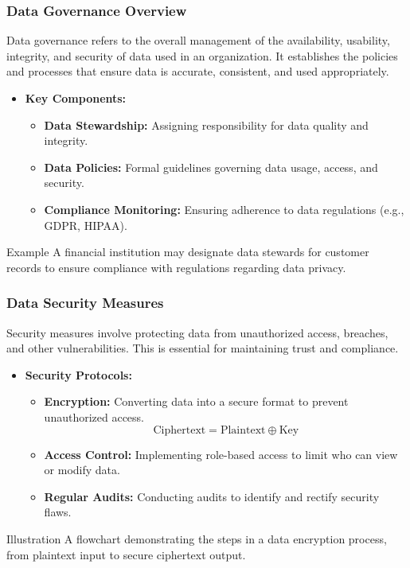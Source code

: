 \documentclass{beamer}
\begin{document}
\begin{frame}[fragile]
    \frametitle{Data Governance Overview}
    Data governance refers to the overall management of the availability, usability, integrity, and security of data used in an organization. 
    It establishes the policies and processes that ensure data is accurate, consistent, and used appropriately.

    \begin{itemize}
        \item \textbf{Key Components:}
        \begin{itemize}
            \item \textbf{Data Stewardship:} Assigning responsibility for data quality and integrity.
            \item \textbf{Data Policies:} Formal guidelines governing data usage, access, and security.
            \item \textbf{Compliance Monitoring:} Ensuring adherence to data regulations (e.g., GDPR, HIPAA).
        \end{itemize}
    \end{itemize}

    \begin{block}{Example}
        A financial institution may designate data stewards for customer records to ensure compliance with regulations regarding data privacy.
    \end{block}
\end{frame}

\begin{frame}[fragile]
    \frametitle{Data Security Measures}
    Security measures involve protecting data from unauthorized access, breaches, and other vulnerabilities. This is essential for maintaining trust and compliance.

    \begin{itemize}
        \item \textbf{Security Protocols:}
        \begin{itemize}
            \item \textbf{Encryption:} Converting data into a secure format to prevent unauthorized access.
            \begin{equation}
                \text{Ciphertext} = \text{Plaintext} \oplus \text{Key}
            \end{equation}
            \item \textbf{Access Control:} Implementing role-based access to limit who can view or modify data.
            \item \textbf{Regular Audits:} Conducting audits to identify and rectify security flaws.
        \end{itemize}
    \end{itemize}

    \begin{block}{Illustration}
        A flowchart demonstrating the steps in a data encryption process, from plaintext input to secure ciphertext output.
    \end{block}
\end{frame}
\end{document}
